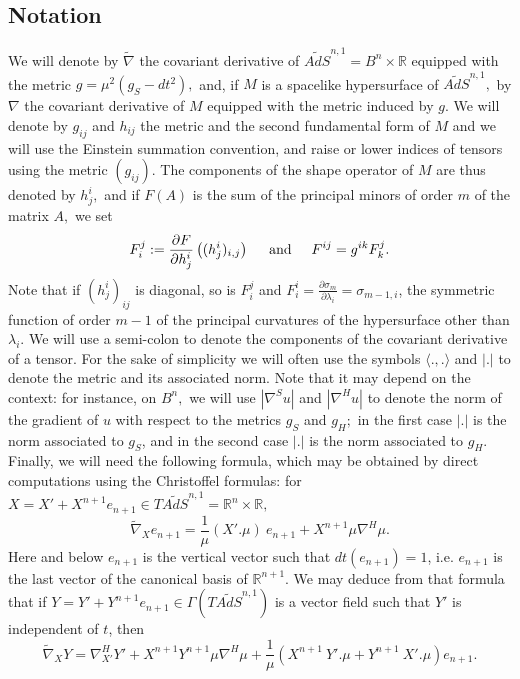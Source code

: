 \documentclass[10pt,reqno,oneside]{amsart}
\theoremstyle{definition}
\theoremstyle{remark}
\newcommand{\R}{\mathbb{R}}
\begin{document}
\subsection{Notation}
We will denote by $\widetilde{\nabla}$ the covariant derivative of $\widetilde{AdS}^{n,1}=B^n\times\R$ equipped with the metric $g=\mu^2(g_S-dt^2),$ and, if $M$ is a spacelike hypersurface of $\widetilde{AdS}^{n,1},$ by $\nabla$ the covariant derivative of $M$ equipped with the metric induced by $g.$ We will denote by $g_{ij}$ and $h_{ij}$ the metric and the second fundamental form of $M$ and we will use the Einstein summation convention, and raise or lower indices of tensors using the metric $(g_{ij}).$ The components of the shape operator of $M$ are thus denoted by $h^i_j,$ and if $F(A)$ is the sum of the principal minors of order $m$ of the matrix $A,$ we set
$$F_i^j:=\frac{\partial F}{\partial h^i_j}\left((h^i_j)_{i,j}\right)\hspace{.5cm}\mbox{and}\hspace{.5cm}F^{ij}=g^{ik}F_k^j.$$
Note that if $(h^i_j)_{ij}$ is diagonal, so is $F_i^j$ and $F^i_ i=\frac{\partial\sigma_m}{\partial\lambda_i}=\sigma_{m-1,i}$, the symmetric function of order $m-1$ of the principal curvatures of the hypersurface other than $\lambda_i.$ We will use a semi-colon to denote the components of the covariant derivative of a tensor. For the sake of simplicity we will often use the symbols $\langle.,.\rangle$ and $|.|$ to denote the metric and its associated norm. Note that it may depend on the context: for instance, on $B^n,$ we will use $|\nabla^Su|$ and $|\nabla^Hu|$ to denote the norm of the gradient of $u$ with respect to the metrics $g_S$ and $g_H;$ in the first case $|.|$ is the norm associated to $g_S$, and in the second case $|.|$ is the norm associated to $g_H$. Finally, we will need the following formula, which may be obtained by direct computations using the Christoffel formulas: for $X=X'+X^{n+1}e_{n+1}\in T\widetilde{AdS}^{n,1}=\R^n\times\R,$
\begin{equation}\label{notation C1 dev cov en+1}
\widetilde{\nabla}_Xe_{n+1}=\frac{1}{\mu}(X'.\mu)\ e_{n+1}+X^{n+1}\mu\nabla^H\mu.
\end{equation}
Here and below $e_{n+1}$ is the vertical vector such that $dt(e_{n+1})=1$, i.e. $e_{n+1}$ is the last vector of the canonical basis of $\R^{n+1}$. We may deduce from that formula that if $Y=Y'+Y^{n+1}e_{n+1}\in \Gamma(T\widetilde{AdS}^{n,1})$ is a vector field such that $Y'$ is independent of $t$, then
\begin{equation}\label{notation C1 dev cov Y}
\widetilde{\nabla}_XY=\nabla^H_{X'}{Y'}+X^{n+1}Y^{n+1}\mu\nabla^H\mu+\frac{1}{\mu}\left(X^{n+1}\ Y'.\mu+Y^{n+1}\ X'.\mu\right)e_{n+1}.
\end{equation}
\end{document}
